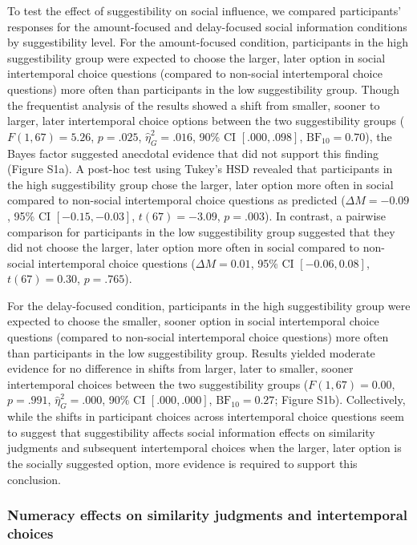 \documentclass[
  pub,floatsintext]{apa6}
\begin{document}
To test the effect of suggestibility on social influence, we compared participants' responses for the amount-focused and delay-focused social information conditions by suggestibility level. For the amount-focused condition, participants in the high suggestibility group were expected to choose the larger, later option in social intertemporal choice questions (compared to non-social intertemporal choice questions) more often than participants in the low suggestibility group. Though the frequentist analysis of the results showed a shift from smaller, sooner to larger, later intertemporal choice options between the two suggestibility groups (\(F(1, 67) = 5.26\), \(p = .025\), \(\hat{\eta}^2_G = .016\), 90\% CI \([.000, .098]\), \(\mathrm{BF}_{\textrm{10}} = 0.70\)), the Bayes factor suggested anecdotal evidence that did not support this finding (Figure S1a). A post-hoc test using Tukey's HSD revealed that participants in the high suggestibility group chose the larger, later option more often in social compared to non-social intertemporal choice questions as predicted (\(\Delta M = -0.09\), 95\% CI \([-0.15, -0.03]\), \(t(67) = -3.09\), \(p = .003\)). In contrast, a pairwise comparison for participants in the low suggestibility group suggested that they did not choose the larger, later option more often in social compared to non-social intertemporal choice questions (\(\Delta M = 0.01\), 95\% CI \([-0.06, 0.08]\), \(t(67) = 0.30\), \(p = .765\)).

For the delay-focused condition, participants in the high suggestibility group were expected to choose the smaller, sooner option in social intertemporal choice questions (compared to non-social intertemporal choice questions) more often than participants in the low suggestibility group. Results yielded moderate evidence for no difference in shifts from larger, later to smaller, sooner intertemporal choices between the two suggestibility groups (\(F(1, 67) = 0.00\), \(p = .991\), \(\hat{\eta}^2_G = .000\), 90\% CI \([.000, .000]\), \(\mathrm{BF}_{\textrm{10}} = 0.27\); Figure S1b). Collectively, while the shifts in participant choices across intertemporal choice questions seem to suggest that suggestibility affects social information effects on similarity judgments and subsequent intertemporal choices when the larger, later option is the socially suggested option, more evidence is required to support this conclusion.

\hypertarget{numeracy-effects-on-similarity-judgments-and-intertemporal-choices}{%
\subsubsection{Numeracy effects on similarity judgments and intertemporal choices}\label{numeracy-effects-on-similarity-judgments-and-intertemporal-choices}}
\end{document}
